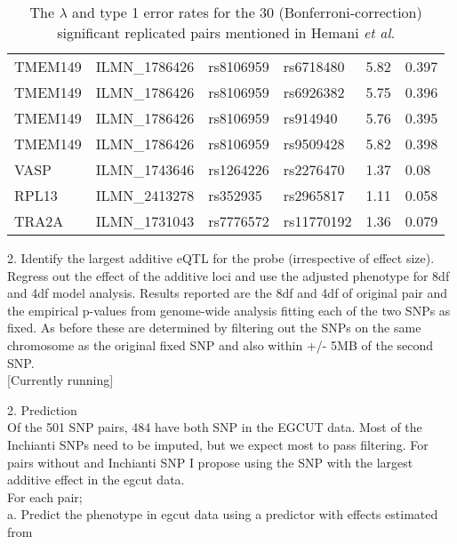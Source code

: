 \documentclass[paper=a4, fontsize=11pt]{scrartcl}         %
\numberwithin{equation}{section}                  %
\numberwithin{figure}{section}                    %
\numberwithin{table}{section}                   %
\begin{document}
\begin{table}[ht]
\begin{tabular}{llllll}
TMEM149 & ILMN\_1786426 & rs8106959 & rs6718480 & 5.82 & 0.397 \\ 
TMEM149 & ILMN\_1786426 & rs8106959 & rs6926382 & 5.75 & 0.396 \\ 
TMEM149 & ILMN\_1786426 & rs8106959 & rs914940 & 5.76 & 0.395 \\ 
TMEM149 & ILMN\_1786426 & rs8106959 & rs9509428 & 5.82 & 0.398 \\ 
VASP & ILMN\_1743646 & rs1264226 & rs2276470 & 1.37 & 0.08 \\ 
RPL13 & ILMN\_2413278 & rs352935 & rs2965817 & 1.11 & 0.058 \\ 
TRA2A & ILMN\_1731043 & rs7776572 & rs11770192 & 1.36 & 0.079 \\ 
   \hline
\end{tabular}
\caption*{The $\lambda$ and type 1 error rates for the 30 (Bonferroni-correction) significant replicated pairs mentioned in Hemani \emph{et al}.}
\end{table}

\newpage

2. Identify the largest additive eQTL for the probe (irrespective of effect size). Regress out the effect of the additive loci and use the adjusted phenotype for 8df and 4df model analysis. Results reported are the 8df and 4df of original pair and the empirical p-values from genome-wide analysis fitting each of the two SNPs as fixed. As before these are determined by filtering out the SNPs on the same chromosome as the original fixed SNP and also within +/- 5MB of the second SNP. \\

[Currently running]

\vspace{1cm}

2. Prediction \\

Of the 501 SNP pairs, 484 have both SNP in the EGCUT data. Most of the Inchianti SNPs need to be imputed, but we expect most to pass filtering. For pairs without and Inchianti SNP I propose using the SNP with the largest additive effect in the egcut data. \\

For each pair; \\

a. Predict the phenotype in egcut data using a predictor with effects estimated from \\
\end{document}
